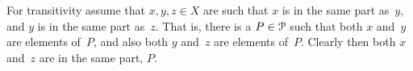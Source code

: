 \documentclass{ibl}  %
\begin{document}
\begin{problem}
\begin{exes}
\begin{answer}
  For transitivity assume that $x,y,z\in X$ are such that 
  $x$ is in the same part as~$y$, and 
  $y$ is in the same part as~$z$.
  That is, there is a $P\in\EuScript{P}$ such that
  both $x$ and~$y$ are elements of~$P$, 
  and also both $y$ and~$z$ are elements of~$P$.
  Clearly then both $x$ and~$z$ are in the same part, $P$.  
\end{answer}
\end{exes}
 





\end{problem}
\end{document}
